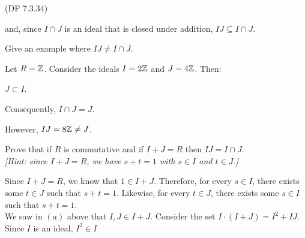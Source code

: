 \begin{problem}{(\textsf{DF 7.3.34})}
\begin{enumalph}
\begin{Answer}
\begin{enumroman}
            and, since $I \cap J$ is an ideal that is closed under addition,
            $IJ \subseteq I \cap J$.
        \end{enumroman}
      \end{Answer}
    \item Give an example where $IJ \neq I \cap J$.
      \begin{Answer}
        Let $R = \mathbb{Z}$. Consider the ideals $I = 2\mathbb{Z}$ and $J = 4\mathbb{Z}$. Then:
        \begin{enumalph}
          \item $J \subset I$.
          \item Consequently, $I \cap J = J$.
          \item However, $IJ = 8\mathbb{Z} \neq J$.
        \end{enumalph}
      \end{Answer}
    \newpage
    \item Prove that if $R$ is commutative and if $I+J=R$ then $IJ = I \cap J$. \\
      \emph{[Hint: since $I+J=R$, we have $s+t=1$ with $s \in I$ and $t \in J$.]}
      \begin{Answer}
        Since $I + J = R$, we know that $1 \in I + J$.
        Therefore, for every $s \in I$, there exists some $t \in J$
        such that $s + t = 1$. Likewise, for every $t \in J$, there exists
        some $s \in I$ such that $s + t = 1$. \\
        We saw in $(a)$ above that $I, J \in I + J$.
        Consider the set $I \cdot (I + J) = I^2 + IJ$.
        Since $I$ is an ideal, $I^2 \in I$
      \end{Answer}
  \end{enumalph}
\end{problem}
